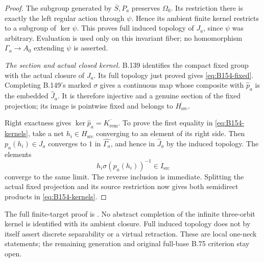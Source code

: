 \begin{proof}
The subgroup generated by $\overline S,P_a$ preserves $\Omega_0$.
Its restriction there is exactly the left regular action through
$\psi$. Hence its ambient finite kernel restricts to a subgroup of
$\ker\psi$. This proves full induced topology of $J_a$, since $\psi$
was arbitrary. Evaluation is used only on this invariant fiber;
no homomorphism $\Gamma_a\to A_0$ extending $\psi$ is asserted.

\emph{The section and actual closed kernel.}
B.139 identifies the compact fixed group with the actual closure of
$J_a$. Its full topology just proved gives \eqref{eq:B154-fixed}.
Completing B.149's marked $\sigma$ gives a continuous map whose
composite with $\widehat p_a$ is the embedded $\widehat J_a$.
It is therefore injective and a genuine section of the fixed
projection; its image is pointwise fixed and belongs to
$\overline{H_{\mathrm{src}}}$.

Right exactness gives
$\ker\widehat p_a=\overline{K_{\mathrm{rem}}}$.
To prove the first equality in \eqref{eq:B154-kernels}, take a net
$h_i\in H_{\mathrm{src}}$ converging to an element of its right side.
Then $p_a(h_i)\in J_a$ converges to $1$ in
$\widehat{\Gamma_a}$, and hence in $\widehat J_a$ by the induced
topology. The elements
\[
 h_i\sigma(p_a(h_i))^{-1}\in I_{\mathrm{src}}
\]
converge to the same limit. The reverse inclusion is immediate.
Splitting the actual fixed projection and its source restriction now
gives both semidirect products in \eqref{eq:B154-kernels}.
\end{proof}
The full finite-target proof is
.
No abstract completion of the infinite three-orbit kernel is identified
with its ambient closure. Full induced topology does not by itself
assert discrete separability or a virtual retraction. These are local
one-neck statements; the remaining generation and original full-base
B.75 criterion stay open.
